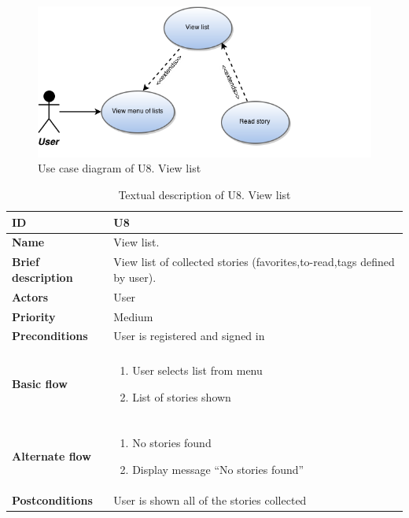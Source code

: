 \begin{figure}[htp]
	\includegraphics[width=\textwidth]{fig/U8}
	\centering
	\caption{Use case diagram of U8. View list}
	\label{Fig:U8}
\end{figure}

\begin{table}[htp]
	\centering
	\caption{Textual description of U8. View list}
	\begin{tabular}[b]{|l | l|}\hline
		\textbf{ID} 				& U8									\\\hline
		\textbf{Name} 				& View list.							\\\hline
		\textbf{Brief description}	& View list of collected stories (favorites,to-read,tags defined by user). 			\\\hline
		\textbf{Actors} 			& User									\\\hline
		\textbf{Priority}			& Medium								\\\hline
		\textbf{Preconditions}		& User is registered and signed in		\\\hline&\\[-2ex]
		\textbf{Basic flow}			& \begin{minipage}{5in}
			\begin{enumerate}[noitemsep]
				\item User selects list from menu
				\item List of stories shown
			\end{enumerate}						
		\end{minipage}						\\\hline&\\[-2ex]
		\textbf{Alternate flow}		& \begin{minipage}{5in}
			\begin{enumerate}[noitemsep]
				\item No stories found
				\item Display message “No stories found”
			\end{enumerate}
		\end{minipage}							\\\hline
		\textbf{Postconditions}		& User is shown all of the stories collected\\\hline
	\end{tabular}
	\label{Tab:U8}
\end{table}

